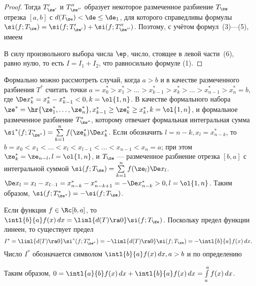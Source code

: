 \documentclass[a4paper]{article}
\begin{document}
\begin{proof}
Тогда $T'_{\ze'}$ и $T''_{\ze''}$ образует некоторое размеченное
разбиение $T_{\ze}$ отрезка $[a,b]$ с $d(T_{\ze})<\de\le\de_1$, для
которого справедливы формулы $\si(f;T_{\ze})=\si(f;T'_{\ze'})+
\si(f;T''_{\ze''})$. Поэтому, с учётом формул~(3)---(5), имеем

В силу произвольного выбора числа $\ep$, число, стоящее в левой
части~(6), равно нулю, то есть $I=I_1+I_2$, что равносильно формуле
(1).
\end{proof}

\begin{note}
Формально можно рассмотреть случай, когда $a>b$ и в качестве
размеченного разбиения $T^{*}$ считать точки $a=x_0^* > x_1^* >
\dots > x_{k-1}^* > x_k^* > \dots > x_{n-1}^* > x_n^*=b$, где
$\De x_k^*=x_k^* - x_{k-1}^* < 0, k=\ol{1,n}$. В качестве
формального набора $\ze^*=\hr{\ze_1^*,\dots,\ze_n^*},x_{k-1}^* \ge
\ze_k^* \ge x_k^*,k=\ol{1,n}$, и формальное размеченное
разбиение $T_{\ze^*}^*$, которому отвечает формальная интегральная
сумма $\si^*(f; T^*_{\ze^*})=\sum\limits_{k=1}^n f(\ze^*_k) \De
x^*_k$. Если обозначить $l=n-k, x_l=x^*_{n-k}$, то $b=x_0<x_1<\dots
<x_l<x_{l-1}< \dots < x_{n-1} < x_n = a$; при этом $\ze^*_k=
\ze_{n-l},l=\ol {1,n}$, и $T_{\ze}$ --- размеченное разбиение
отрезка $[b,a]$ с интегральной суммой
$\si(f;T_{\ze})=\sum\limits_{k=1}^n f(\ze_l) \De x_l$. $\De
x_l=x_l-x_{l-1} = x^*_{n-k} - x^*_{n-k+1} = -\De x^*_{n-k} >
0,l=\ol{1,n}$. Таким образом, $\si(f;T^*_{\ze^*})= -
\si(f;T_{\ze})$.

Если функция $f\in\Rc[b,a]$, то $\intl{b}{a} f(x)\,dx= \liml{d(T)\ra 0} \si(f;T_{\ze})$. Поскольку предел функции линеен, то
существует предел
$$I^* = \liml{d(T)\ra 0} \si^*(f; T^*_{\ze^*}) = - \liml{d(T)\ra 0} \si(f;T_{\ze}) = -\intl{b}{a} f(x)\,dx.$$
Число $I^*$ обозначается символом $\intl{b}{a} f(x)\,dx, a>b$ и по определению

Таким образом, $0=\intl{a}{b} f(x)\,dx + \intl{b}{a}
f(x)\,dx = \int\limits_a^a f(x)\,dx$.
\end{note}
\end{document}
